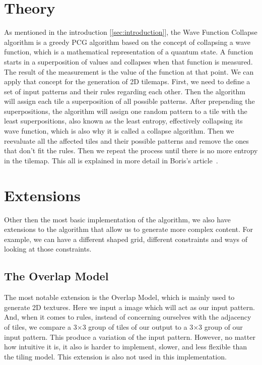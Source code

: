 \documentclass[10pt,oneside,a4paper]{article}
\begin{document}
\section{Theory}\label{sec:theory}
As mentioned in the introduction [\ref*{sec:introduction}], the Wave Function Collapse algorithm is a greedy PCG algorithm based on the concept of collapsing a wave function, which is a mathematical representation of a quantum state.
A function starts in a superposition of values and collapses when that function is measured.
The result of the measurement is the value of the function at that point.
We can apply that concept for the generation of 2D tilemaps.
First, we need to define a set of input patterns and their rules regarding each other.
Then the algorithm will assign each tile a superposition of all possible patterns.
After prepending the superpositions, the algorithm will assign one random pattern to a tile with the least superpositions, also known as the least entropy, effectively collapsing its wave function, which is also why it is called a collapse algorithm.
Then we reevaluate all the affected tiles and their possible patterns and remove the ones that don't fit the rules.
Then we repeat the process until there is no more entropy in the tilemap.
This all is explained in more detail in Boris's article~\cite{WFCE}.

\section{Extensions}\label{sec:extensions}
Other then the most basic implementation of the algorithm, we also have extensions to the algorithm that allow us to generate more complex content.
For example, we can have a different shaped grid, different constraints and ways of looking at those constraints.

\subsection{The Overlap Model}
The most notable extension is the Overlap Model, which is mainly used to generate 2D textures.
Here we input a image which will act as our input pattern.
And, when it comes to rules, instead of concerning ourselves with the adjacency of tiles, we compare a 3$\times$3 group of tiles of our output to a 3$\times$3 group of our input pattern.
This produce a variation of the input pattern.
However, no matter how intuitive it is, it also is harder to implement, slower, and less flexible than the tiling model.
This extension is also not used in this implementation.
\end{document}

